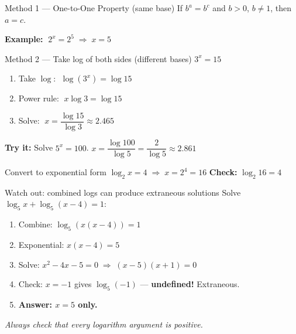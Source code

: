 \documentclass[aspectratio=169, 11pt]{beamer}
\begin{document}
\begin{frame}[t, plain]

  \vspace{0.2cm}
  \begin{block}{Method 1 --- One-to-One Property (same base)}
    If $b^a = b^c$ and $b>0$, $b\ne1$, then $a = c$.

    \vspace{0.15cm}
    \textbf{Example:} $\;2^x = 2^5 \;\Rightarrow\; x = 5$
  \end{block}

  \vspace{0.25cm}
  \begin{block}{Method 2 --- Take log of both sides (different bases)}
    $3^x = 15$
    \setlength{\itemsep}{4pt}
    \begin{enumerate}
      \item Take $\log$: $\;\log(3^x) = \log 15$
      \item Power rule: $\;x\log 3 = \log 15$
      \item Solve: $\;x = \dfrac{\log 15}{\log 3} \approx 2.465$
    \end{enumerate}
  \end{block}

  \vspace{0.2cm}
  \textbf{Try it:} Solve $5^x = 100$. \quad $x = \dfrac{\log 100}{\log 5} = \dfrac{2}{\log 5} \approx 2.861$
\end{frame}

\begin{frame}[t, plain]

  \vspace{0.2cm}
  \begin{block}{Convert to exponential form}
    $\log_2 x = 4 \;\Rightarrow\; x = 2^4 = 16$\quad
    \textbf{Check:} $\log_2 16 = 4$ \checkmark
  \end{block}

  \vspace{0.25cm}
  \begin{block}{Watch out: combined logs can produce extraneous solutions}
    Solve $\log_5 x + \log_5(x-4) = 1$:
    \setlength{\itemsep}{3pt}
    \begin{enumerate}
      \item Combine: $\log_5(x(x-4)) = 1$
      \item Exponential: $x(x-4) = 5$
      \item Solve: $x^2-4x-5=0 \;\Rightarrow\; (x-5)(x+1)=0$
      \item Check: $x=-1$ gives $\log_5(-1)$ --- \textbf{undefined!} Extraneous.
      \item \textbf{Answer: $x = 5$ only.}
    \end{enumerate}
  \end{block}

  \vspace{0.1cm}
  \textit{Always check that every logarithm argument is positive.}
\end{frame}
\end{document}
